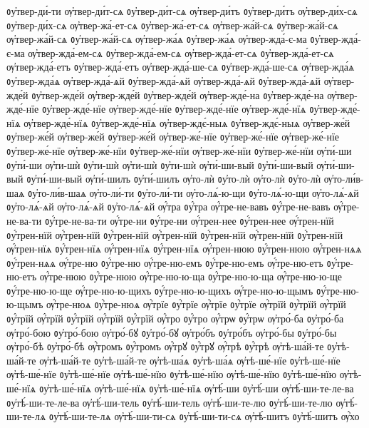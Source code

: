 {ᲂу҆твер-ди́-ти
ѹ҆твер-ди́т-сѧ
ᲂу҆твер-ди́т-сѧ
ѹ҆твер-ди́тъ
ᲂу҆твер-ди́тъ
ѹ҆твер-ди́х-сѧ
ᲂу҆твер-ди́х-сѧ
ѹ҆твер-жа́-ет-сѧ
ᲂу҆твер-жа́-ет-сѧ
ѹ҆твер-жа́й-сѧ
ᲂу҆твер-жа́й-сѧ
ѹ҆твер-жа́й-сѧ
ᲂу҆твер-жа́й-сѧ
ѹ҆твер-жа́ѧ
ᲂу҆твер-жа́ѧ
ѹ҆твер-жда́-є-ма
ᲂу҆твер-жда́-є-ма
ѹ҆твер-жда́-ем-сѧ
ᲂу҆твер-жда́-ем-сѧ
ѹ҆твер-жда́-ет-сѧ
ᲂу҆твер-жда́-ет-сѧ
ѹ҆твер-жда́-етъ
ᲂу҆твер-жда́-етъ
ѹ҆твер-жда́-ше-сѧ
ᲂу҆твер-жда́-ше-сѧ
ѹ҆твер-жда́ѧ
ᲂу҆твер-жда́ѧ
ѹ҆твер-жда́-ѧй
ᲂу҆твер-жда́-ѧй
ѹ҆твер-жда́-ѧй
ᲂу҆твер-жда́-ѧй
ѹ҆твер-жде́й
ᲂу҆твер-жде́й
ѹ҆твер-жде́й
ᲂу҆твер-жде́й
ѹ҆твер-жде́-на
ᲂу҆твер-жде́-на
ѹ҆твер-жде́-нїе
ᲂу҆твер-жде́-нїе
ѹ҆твер-жде́-нїе
ᲂу҆твер-жде́-нїе
ѹ҆твер-жде́-нїѧ
ᲂу҆твер-жде́-нїѧ
ѹ҆твер-жде́-нїѧ
ᲂу҆твер-жде́-нїѧ
ѹ҆твер-ждє́-ныѧ
ᲂу҆твер-ждє́-ныѧ
ѹ҆твер-же́й
ᲂу҆твер-же́й
ѹ҆твер-же́й
ᲂу҆твер-же́й
ѹ҆твер-же́-нїе
ᲂу҆твер-же́-нїе
ѹ҆твер-же́-нїе
ᲂу҆твер-же́-нїе
ѹ҆твер-же́-нїи
ᲂу҆твер-же́-нїи
ѹ҆твер-же́-нїи
ᲂу҆твер-же́-нїи
ѹ҆ти́-ши
ᲂу҆ти́-ши
ѹ҆ти-шѝ
ᲂу҆ти-шѝ
ѹ҆ти-шѝ
ᲂу҆ти-шѝ
ѹ҆ти́-ши-вый
ᲂу҆ти́-ши-вый
ѹ҆ти́-ши-вый
ᲂу҆ти́-ши-вый
ѹ҆ти́-шилъ
ᲂу҆ти́-шилъ
ѹ҆то-лѝ
ᲂу҆то-лѝ
ѹ҆то-лѝ
ᲂу҆то-лѝ
ѹ҆то-ли́в-шаѧ
ᲂу҆то-ли́в-шаѧ
ѹ҆то-ли́-ти
ᲂу҆то-ли́-ти
ѹ҆то-лѧ́-ю-щи
ᲂу҆то-лѧ́-ю-щи
ѹ҆то-лѧ́-ѧй
ᲂу҆то-лѧ́-ѧй
ѹ҆то-лѧ́-ѧй
ᲂу҆то-лѧ́-ѧй
ѹ҆́тра
ᲂу҆́тра
ѹ҆́тре-не-вавъ
ᲂу҆́тре-не-вавъ
ѹ҆́тре-не-ва-ти
ᲂу҆́тре-не-ва-ти
ѹ҆́тре-ни
ᲂу҆́тре-ни
ѹ҆́трен-нее
ᲂу҆́трен-нее
ѹ҆́трен-нїй
ᲂу҆́трен-нїй
ѹ҆́трен-нїй
ᲂу҆́трен-нїй
ѹ҆́трен-нїй
ᲂу҆́трен-нїй
ѹ҆́трен-нїй
ᲂу҆́трен-нїй
ѹ҆́трен-нїѧ
ᲂу҆́трен-нїѧ
ѹ҆́трен-нїѧ
ᲂу҆́трен-нїѧ
ѹ҆́трен-нюю
ᲂу҆́трен-нюю
ѹ҆́трен-нѧѧ
ᲂу҆́трен-нѧѧ
ѹ҆́тре-ню
ᲂу҆́тре-ню
ѹ҆́тре-ню-емъ
ᲂу҆́тре-ню-емъ
ѹ҆́тре-ню-етъ
ᲂу҆́тре-ню-етъ
ѹ҆́тре-нюю
ᲂу҆́тре-нюю
ѹ҆́тре-ню-ю-ща
ᲂу҆́тре-ню-ю-ща
ѹ҆́тре-ню-ю-ще
ᲂу҆́тре-ню-ю-ще
ѹ҆́тре-ню-ю-щихъ
ᲂу҆́тре-ню-ю-щихъ
ѹ҆́тре-ню-ю-щымъ
ᲂу҆́тре-ню-ю-щымъ
ѹ҆́тре-нюѧ
ᲂу҆́тре-нюѧ
ѹ҆́трїе
ᲂу҆́трїе
ѹ҆́трїе
ᲂу҆́трїе
ѹ҆́трїй
ᲂу҆́трїй
ѹ҆́трїй
ᲂу҆́трїй
ѹ҆́трїй
ᲂу҆́трїй
ѹ҆́трїй
ᲂу҆́трїй
ѹ҆́тро
ᲂу҆́тро
ѹ҆́трѡ
ᲂу҆́трѡ
ѹ҆тро́-ба
ᲂу҆тро́-ба
ѹ҆тро́-бою
ᲂу҆тро́-бою
ѹ҆тро́-бꙋ
ᲂу҆тро́-бꙋ
ѹ҆тро́бъ
ᲂу҆тро́бъ
ѹ҆тро́-бы
ᲂу҆тро́-бы
ѹ҆тро́-бѣ
ᲂу҆тро́-бѣ
ѹ҆́тромъ
ᲂу҆́тромъ
ѹ҆́трꙋ
ᲂу҆́трꙋ
ѹ҆́трѣ
ᲂу҆́трѣ
ѹ҆тѣ-ша́й-те
ᲂу҆тѣ-ша́й-те
ѹ҆тѣ-ша́й-те
ᲂу҆тѣ-ша́й-те
ѹ҆тѣ-ша́ѧ
ᲂу҆тѣ-ша́ѧ
ѹ҆тѣ-ше́-нїе
ᲂу҆тѣ-ше́-нїе
ѹ҆тѣ-ше́-нїе
ᲂу҆тѣ-ше́-нїе
ѹ҆тѣ-ше́-нїю
ᲂу҆тѣ-ше́-нїю
ѹ҆тѣ-ше́-нїю
ᲂу҆тѣ-ше́-нїю
ѹ҆тѣ-ше́-нїѧ
ᲂу҆тѣ-ше́-нїѧ
ѹ҆тѣ-ше́-нїѧ
ᲂу҆тѣ-ше́-нїѧ
ѹ҆тѣ́-ши
ᲂу҆тѣ́-ши
ѹ҆тѣ́-ши-те-ле-ва
ᲂу҆тѣ́-ши-те-ле-ва
ѹ҆тѣ́-ши-тель
ᲂу҆тѣ́-ши-тель
ѹ҆тѣ́-ши-те-лю
ᲂу҆тѣ́-ши-те-лю
ѹ҆тѣ́-ши-те-лѧ
ᲂу҆тѣ́-ши-те-лѧ
ѹ҆тѣ́-ши-ти-сѧ
ᲂу҆тѣ́-ши-ти-сѧ
ѹ҆тѣ́-шитъ
ᲂу҆тѣ́-шитъ
ѹ҆́хо
}
